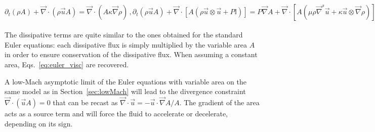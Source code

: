 \documentclass[review,10pt]{elsarticle}
\renewcommand{\div}{\vec{\nabla}\! \cdot \!}
\newcommand{\grad}{\vec{\nabla}}
\newcommand{\eqt}[1]{Eq.~(\ref{#1})}                     %
\newcommand{\sct}[1]{Section~\ref{#1}}                   %
\begin{document}
\begin{subequations}
\label{eq:euler_variable_A_bis}
\begin{equation}
\partial_t \left( \rho A \right) + \div \left( \rho \vec{u} A \right) = \div \left( A \kappa \grad \rho \right) \,,
\end{equation}
%
\begin{equation}\label{eq:euler_eq_mom_var_A}
\partial_t \left( \rho \vec{u} A \right) + \div \left[A\left( \rho \vec{u} \otimes \vec{u} + P \mathbb{I} \right) \right] = P \grad A + \div \left[ A \left( \mu \rho \grad^s \vec{u}  + \kappa \vec{u} \otimes \grad \rho \right) \right] \,,
\end{equation}
%
\begin{multline}\label{eq:euler_eq_ener_var_A}
\partial_t \left( \rho A E \right) + \div \left[ \vec{u} A\left( \rho E + P \right) \right] = \\ \div \left[ A \left( \kappa \grad \left( \rho e \right) + \frac{1}{2}|| \vec{u} ||^2 \kappa \grad \rho +  \rho \mu \vec{u} \grad^s \vec{u}  \right) \right] \,.
\end{multline}
\end{subequations}
%
The dissipative terms are quite similar to the ones obtained for the standard Euler equations: each dissipative 
flux is simply multiplied by the variable area $A$ in order to ensure conservation of the dissipative flux. 
When assuming a constant area, Eqs.~\ref{eq:euler_visc} are recovered.
 
A low-Mach asymptotic limit of the Euler equations with variable area on the same model as in 
\sct{sec:lowMach} will lead to the divergence constraint $\div (\vec{u} A) = 0$ that can be recast 
as $\div \vec{u} = -\vec{u} \cdot \grad{A} / A$. The gradient of the area acts as a source term and 
will force the fluid to accelerate or decelerate, depending on its sign. 
\end{document}
